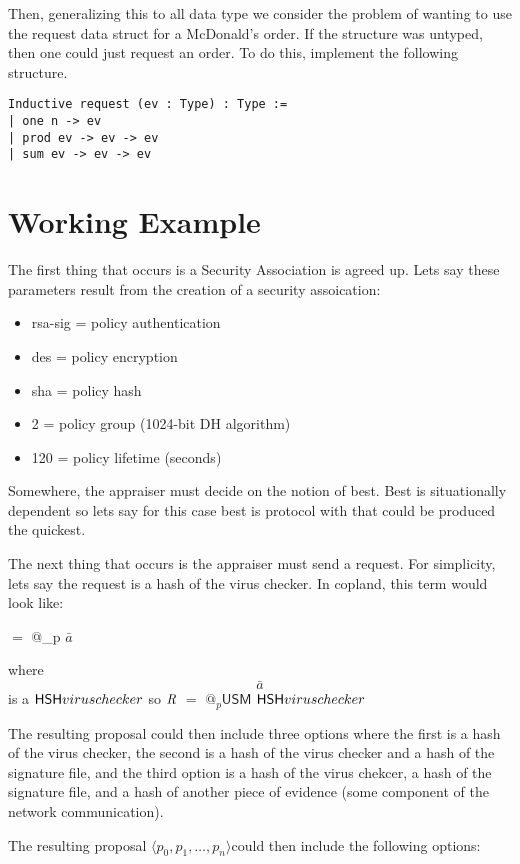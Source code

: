 \documentclass[10pt]{report}
\newcommand{\req}[0]{\cnc{\emph{R}}}
\newcommand{\proposal}[0]{$\langle p_0,p_1,\ldots,p_n\rangle$}
\newcommand{\bara}[0]{$\mathit{\bar{a}}$}
\begin{document}
Then, generalizing this to all data type we consider the problem of wanting
to use the request data struct for a McDonald's order. If the structure was
untyped, then one could just request an order. To do this, implement the
following structure. 

\begin{verbatim}
Inductive request (ev : Type) : Type :=
| one n -> ev
| prod ev -> ev -> ev
| sum ev -> ev -> ev
\end{verbatim}

\section{Working Example}

The first thing that occurs is a Security Association is agreed up.
Lets say these parameters result from the creation of a security
assoication:

\begin{itemize}
\item rsa-sig = policy authentication
\item des = policy encryption
\item sha = policy hash
\item 2 = policy group (1024-bit DH algorithm)
\item 120 = policy lifetime (seconds)
\end{itemize}

Somewhere, the appraiser must decide on the notion of best. Best is
situationally dependent so lets say for this case best is protocol
with that could be produced the quickest. 

The next thing that occurs is the appraiser must send a request.
For simplicity, lets say the request is a hash of the virus checker. In
copland, this term would look like:

\req $=$ @_{p} \bara

where $\bara$  is a  $\mathsf{HSH}{virus checker}$
so $\req$ $=$ $@_{p}\mathsf{USM}$ $\mathsf{HSH}{virus checker}$

The resulting proposal could then include three options where the first
is a hash of the virus checker, the second is a hash of the virus checker
and a hash of the signature file, and the third option is a hash of the
virus chekcer, a hash of the signature file, and a hash of another piece
of evidence (some component of the network communication). 

The resulting proposal \proposal could then include the following options:
\end{document}
